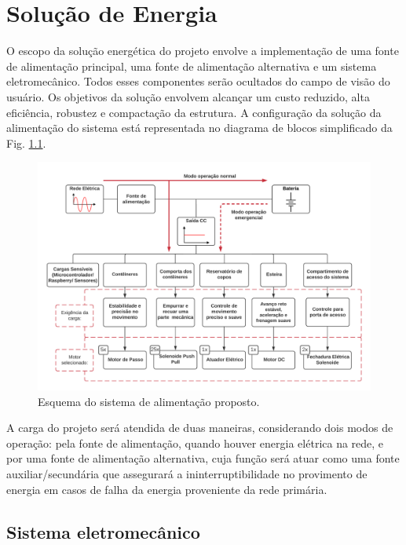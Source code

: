 \chapter[Solução de Energia]{Solução de Energia}
\label{Solução_energia}


O escopo da solução energética do projeto envolve a implementação de uma fonte de alimentação principal, uma fonte de alimentação alternativa e um sistema eletromecânico. Todos esses componentes serão ocultados do campo de visão do usuário. Os objetivos da solução envolvem alcançar um custo reduzido, alta eficiência, robustez e compactação da estrutura. A configuração da solução da alimentação do sistema está representada no diagrama de blocos simplificado da Fig. \ref{fig:energia_alimentacao}.

\begin{figure}[H]
    \centering
    \includegraphics[width=1\textwidth]{figuras/energia/esq_alimentacao.png}
    \caption{Esquema do sistema de alimentação proposto.}
    \label{fig:energia_alimentacao}
\end{figure}

A carga do projeto será atendida de duas maneiras, considerando dois modos de operação: pela fonte de alimentação, quando houver energia elétrica na rede, e por uma fonte de alimentação alternativa, cuja função será atuar como uma fonte auxiliar/secundária que assegurará a ininterruptibilidade no provimento de energia em casos de falha da energia proveniente da rede primária.

\section{Sistema eletromecânico}

